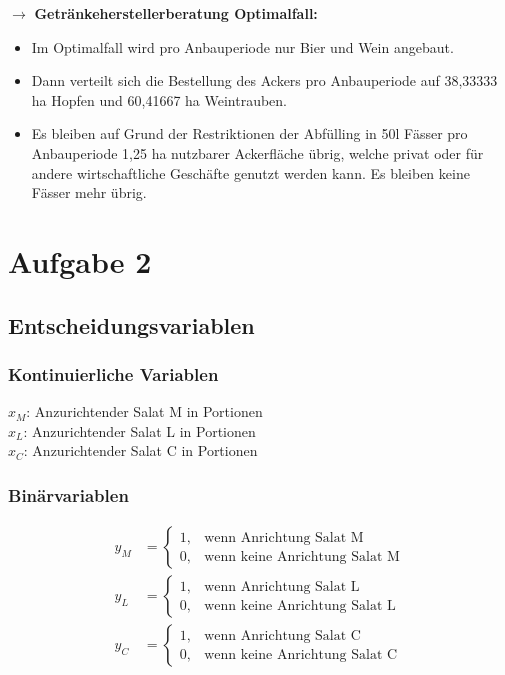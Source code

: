 \documentclass[a4paper,11pt]{article}
\begin{document}
$\to$ \textbf{Getränkeherstellerberatung Optimalfall:} \\
\begin{itemize}
    \item Im Optimalfall wird pro Anbauperiode nur Bier und Wein angebaut. \\
    \item Dann verteilt sich die Bestellung des Ackers pro Anbauperiode auf 38,33333 ha Hopfen und 60,41667 ha Weintrauben. \\
    \item Es bleiben auf Grund der Restriktionen der Abfülling in 50l Fässer pro Anbauperiode 1,25 ha nutzbarer Ackerfläche übrig, welche privat oder für andere wirtschaftliche Geschäfte genutzt werden kann. Es bleiben keine Fässer mehr übrig.
\end{itemize}

\section*{Aufgabe 2}

\subsection*{Entscheidungsvariablen}
\subsubsection*{Kontinuierliche Variablen}
$x_{M}$: Anzurichtender Salat M in Portionen \\
$x_{L}$: Anzurichtender Salat L in Portionen \\
$x_{C}$: Anzurichtender Salat C in Portionen \\
\pagebreak

\subsubsection*{Binärvariablen}

\begin{align*}
y_M &= \begin{cases}
    1, & \text{wenn Anrichtung Salat M} \\
    0, & \text{wenn keine Anrichtung Salat M}
\end{cases} \\
y_L &= \begin{cases}
    1, & \text{wenn Anrichtung Salat L} \\
    0, & \text{wenn keine Anrichtung Salat L}
\end{cases} \\
y_C &= \begin{cases}
    1, & \text{wenn Anrichtung Salat C} \\
    0, & \text{wenn keine Anrichtung Salat C}
\end{cases}
\end{align*}
\end{document}

